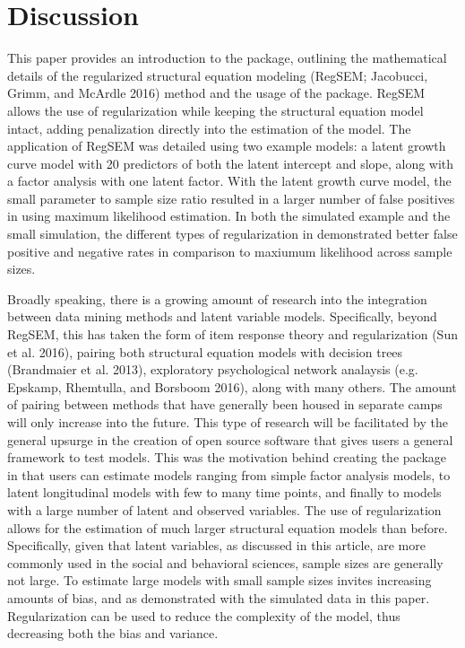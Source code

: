 \documentclass[article]{jss}
\begin{document}
\section{Discussion}\label{discussion}

This paper provides an introduction to the  package,
outlining the mathematical details of the regularized structural
equation modeling (RegSEM; Jacobucci, Grimm, and McArdle 2016) method
and the usage of the  package. RegSEM allows the use of
regularization while keeping the structural equation model intact,
adding penalization directly into the estimation of the model. The
application of RegSEM was detailed using two example models: a latent
growth curve model with 20 predictors of both the latent intercept and
slope, along with a factor analysis with one latent factor. With the
latent growth curve model, the small parameter to sample size ratio
resulted in a larger number of false positives in using maximum
likelihood estimation. In both the simulated example and the small
simulation, the different types of regularization in 
demonstrated better false positive and negative rates in comparison to
maxiumum likelihood across sample sizes.

Broadly speaking, there is a growing amount of research into the
integration between data mining methods and latent variable models.
Specifically, beyond RegSEM, this has taken the form of item response
theory and regularization (Sun et al. 2016), pairing both structural
equation models with decision trees (Brandmaier et al. 2013),
exploratory psychological network analaysis (e.g. Epskamp, Rhemtulla,
and Borsboom 2016), along with many others. The amount of pairing
between methods that have generally been housed in separate camps will
only increase into the future. This type of research will be facilitated
by the general upsurge in the creation of open source software that
gives users a general framework to test models. This was the motivation
behind creating the  package in that users can estimate
models ranging from simple factor analysis models, to latent
longitudinal models with few to many time points, and finally to models
with a large number of latent and observed variables. The use of
regularization allows for the estimation of much larger structural
equation models than before. Specifically, given that latent variables,
as discussed in this article, are more commonly used in the social and
behavioral sciences, sample sizes are generally not large. To estimate
large models with small sample sizes invites increasing amounts of bias,
and as demonstrated with the simulated data in this paper.
Regularization can be used to reduce the complexity of the model, thus
decreasing both the bias and variance.
\end{document}
